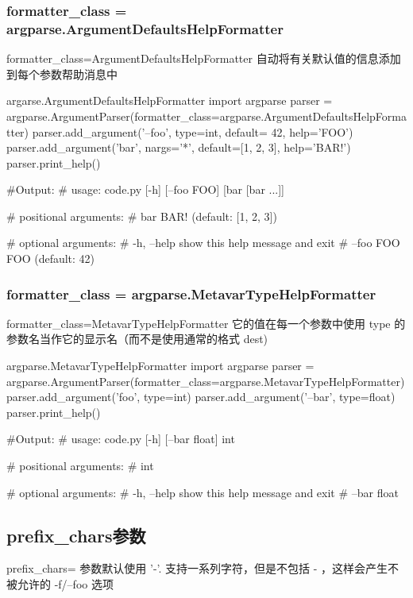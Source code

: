 \documentclass[11pt]{article}
\begin{document}
\subsubsection{formatter\_class = argparse.ArgumentDefaultsHelpFormatter}
		formatter\_class=ArgumentDefaultsHelpFormatter 自动将有关默认值的信息添加到每个参数帮助消息中
	\begin{Python}{argarse.ArgumentDefaultsHelpFormatter}
import argparse
parser = argparse.ArgumentParser(formatter_class=argparse.ArgumentDefaultsHelpFormatter)
parser.add_argument('--foo', type=int, default= 42, help='FOO')
parser.add_argument('bar', nargs='*', default=[1, 2, 3], help='BAR!')
parser.print_help()
		
#Output:
#		usage: code.py [-h] [--foo FOO] [bar [bar ...]]
		
#		positional arguments:
#			bar         BAR! (default: [1, 2, 3])
		
#		optional arguments:
#		  -h, --help  show this help message and exit
#		  --foo FOO   FOO (default: 42)
		
	\end{Python}
\subsubsection{formatter\_class = argparse.MetavarTypeHelpFormatter}
	formatter\_class=MetavarTypeHelpFormatter  它的值在每一个参数中使用 type 的参数名当作它的显示名（而不是使用通常的格式 dest)
	\begin{Python}{argparse.MetavarTypeHelpFormatter}
import argparse
parser = argparse.ArgumentParser(formatter_class=argparse.MetavarTypeHelpFormatter)
parser.add_argument('foo', type=int)
parser.add_argument('--bar', type=float)
parser.print_help()

#Output:
#		usage: code.py [-h] [--bar float] int
		
#		positional arguments:
#		int
		
#		optional arguments:
#		  -h, --help   show this help message and exit
#		  --bar float
		
	\end{Python}
\subsection{prefix\_chars参数}
  prefix\_chars= 参数默认使用 '-'. 支持一系列字符，但是不包括 - ，这样会产生不被允许的 -f/--foo 选项
 
\end{document}
